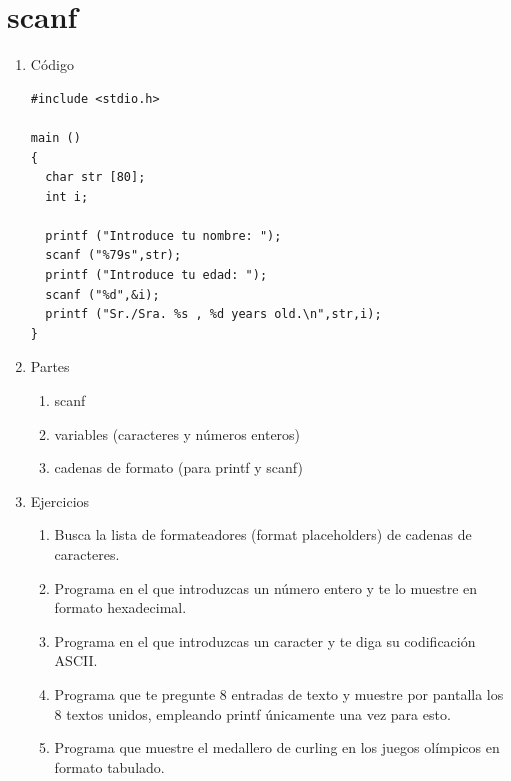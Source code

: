 \documentclass[a4paper,oneside]{article}
\begin{document}
\section{scanf}
  \begin{enumerate}
  \item Código

    \begin{verbatim}
#include <stdio.h>

main ()
{
  char str [80];
  int i;

  printf ("Introduce tu nombre: ");
  scanf ("%79s",str);  
  printf ("Introduce tu edad: ");
  scanf ("%d",&i);
  printf ("Sr./Sra. %s , %d years old.\n",str,i);
}
    \end{verbatim}
  \item Partes
    \begin{enumerate}
    \item scanf
    \item variables (caracteres y números enteros)
    \item cadenas de formato (para printf y scanf)
    \end{enumerate}

  \item Ejercicios
    \begin{enumerate}
    \item Busca la lista de formateadores (format placeholders) de cadenas de caracteres.
    \item Programa en el que introduzcas un número entero y te lo muestre en formato hexadecimal.
    \item Programa en el que introduzcas un caracter y te diga su codificación ASCII.
    \item Programa que te pregunte 8 entradas de texto y muestre por pantalla los 8 textos unidos, empleando printf únicamente una vez para esto.
    \item Programa que muestre el medallero de curling en los juegos olímpicos en formato tabulado.
    \end{enumerate}
  \end{enumerate}
\end{document}
